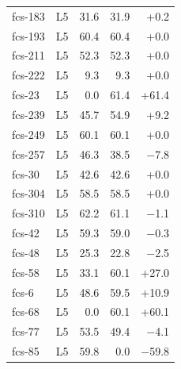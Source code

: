 \begin{longtable}{@{}llrrr@{}}
fcs-183 & L5 & 31.6 & 31.9 & +0.2 \\
fcs-193 & L5 & 60.4 & 60.4 & +0.0 \\
fcs-211 & L5 & 52.3 & 52.3 & +0.0 \\
fcs-222 & L5 & 9.3 & 9.3 & +0.0 \\
fcs-23 & L5 & 0.0 & 61.4 & +61.4 \\
fcs-239 & L5 & 45.7 & 54.9 & +9.2 \\
fcs-249 & L5 & 60.1 & 60.1 & +0.0 \\
fcs-257 & L5 & 46.3 & 38.5 & $-$7.8 \\
fcs-30 & L5 & 42.6 & 42.6 & +0.0 \\
fcs-304 & L5 & 58.5 & 58.5 & +0.0 \\
fcs-310 & L5 & 62.2 & 61.1 & $-$1.1 \\
fcs-42 & L5 & 59.3 & 59.0 & $-$0.3 \\
fcs-48 & L5 & 25.3 & 22.8 & $-$2.5 \\
fcs-58 & L5 & 33.1 & 60.1 & +27.0 \\
fcs-6 & L5 & 48.6 & 59.5 & +10.9 \\
fcs-68 & L5 & 0.0 & 60.1 & +60.1 \\
fcs-77 & L5 & 53.5 & 49.4 & $-$4.1 \\
fcs-85 & L5 & 59.8 & 0.0 & $-$59.8 \\
\bottomrule
\end{longtable}
